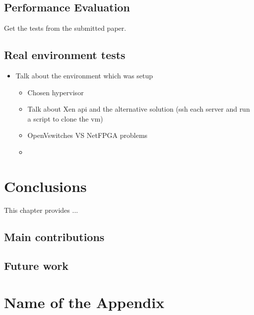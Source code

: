 \documentclass[12pt,english]{book}
\begin{document}
\section{Performance Evaluation}

Get the tests from the submitted paper.
\newpage

\section{Real environment tests}
\begin{itemize}
	\item Talk about the environment which was setup
	\begin{itemize}
		\item Chosen hypervisor
		\item Talk about Xen api and the alternative solution (ssh each server and run a script to clone the vm)
		\item OpenVswitches VS NetFPGA problems
		\item 
	\end{itemize}
\end{itemize}
\newpage

\chapter{Conclusions\label{cha:conclusions}}

This chapter provides ...

\section{Main contributions}

\section{Future work}

\appendix

\chapter{Name of the Appendix}

\cleardoublepage


\cleardoublepage



\nocite{*}
\end{document}
